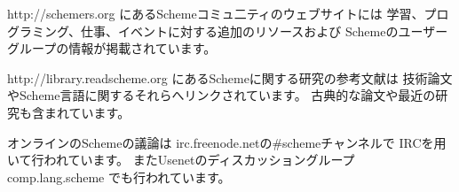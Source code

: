 

{\cf http://schemers.org}
にあるSchemeコミュ二ティのウェブサイトには
学習、プログラミング、仕事、イベントに対する追加のリソースおよび
Schemeのユーザーグループの情報が掲載されています。

{\cf http://library.readscheme.org}
にあるSchemeに関する研究の参考文献は
技術論文やScheme言語に関するそれらへリンクされています。
古典的な論文や最近の研究も含まれています。

オンラインのSchemeの議論は
{\cf irc.freenode.net}の{\cf \#scheme}チャンネルで
IRCを用いて行われています。
またUsenetのディスカッショングループ {\cf comp.lang.scheme}
でも行われています。
